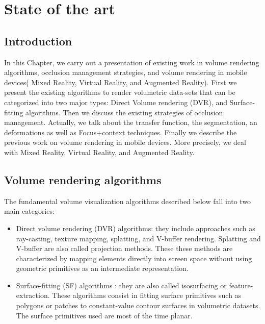 \chapter{State of the art} %
\label{StateOfTheArt}

\section{Introduction}

In this Chapter, we carry out a presentation of existing work in volume rendering algorithms, occlusion management strategies, and volume rendering in mobile devices( Mixed Reality, Virtual Reality, and Augmented Reality). First we present the existing algorithms to render volumetric data-sets that can be categorized into two major types: Direct Volume rendering (DVR), and Surface-fitting algorithms. Then we discuss the existing strategies of occlusion management. Actually, we talk about the transfer function, the segmentation, an deformations as well as Focus+context techniques. Finally we  describe the previous work on  volume rendering in mobile devices. More precisely, we deal with Mixed Reality, Virtual Reality, and Augmented Reality.



\section{Volume rendering algorithms}

The fundamental volume visualization algorithms described
below fall into two main categories: 

\begin{itemize}

\item Direct volume rendering (DVR) algorithms: they include approaches such as ray-casting, texture mapping, splatting, and V-buffer rendering. Splatting and V-buffer are also called projection methods. These these methods are characterized by mapping elements directly into screen space without using geometric primitives as an intermediate representation.

\item Surface-fitting (SF) algorithms : they are also called isosurfacing or feature-extraction. These algorithms consist in fitting surface primitives such as
polygons or patches to constant-value contour surfaces in volumetric datasets. The surface primitives used are most of the time planar.

\end{itemize}


